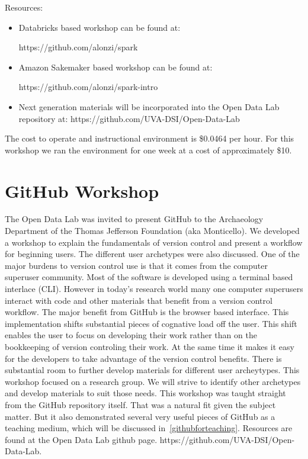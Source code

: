Resources:
\begin{itemize}
\item Databricks based workshop can be found at: 

https://github.com/alonzi/spark
\item Amazon Sakemaker based workshop can be found at: 

https://github.com/alonzi/spark-intro
\item Next generation materials will be incorporated into the Open Data Lab repository at: https://github.com/UVA-DSI/Open-Data-Lab
\end{itemize}

The cost to operate and instructional environment is \$0.0464 per hour. For this workshop we ran the environment for one week at a cost of approximately \$10.

\section{GitHub Workshop}
\label{sec:git}
The Open Data Lab was invited to present GitHub to the Archaeology Department of the Thomas Jefferson Foundation (aka Monticello). We developed a workshop to explain the fundamentals of version control and present a workflow for beginning users. The different user archetypes were also discussed.
One of the major burdens to version control use is that it comes from the computer superuser community. Most of the software is developed using a terminal based interlace (CLI). However in today's research world many one computer superusers interact with code and other materials that benefit from a version control workflow.
The major benefit from GitHub is the browser based interface. This implementation shifts substantial pieces of cognative load off the user. This shift enables the user to focus on developing their work rather than on the bookkeeping of version controling their work. At the same time it makes it easy for the developers to take advantage of the version control benefits.
There is substantial room to further develop materials for different user archeytypes. This workshop focused on a research group. We will strive to identify other archetypes and develop materials to suit those needs.
This workshop was taught straight from the GitHub repository itself. That was a natural fit given the subject matter. But it also demonstrated several very useful pieces of GitHub as a teaching medium, which will be discussed in~\ref{githubforteaching}. Resources are found at the Open Data Lab github page. https://github.com/UVA-DSI/Open-Data-Lab.

